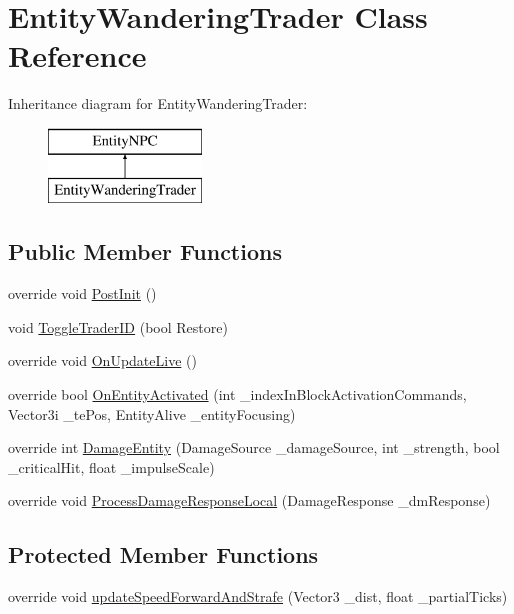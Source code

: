 \hypertarget{class_entity_wandering_trader}{}\section{Entity\+Wandering\+Trader Class Reference}
\label{class_entity_wandering_trader}
Inheritance diagram for Entity\+Wandering\+Trader\+:\begin{figure}[H]
\begin{center}
\leavevmode
\includegraphics[height=2.000000cm]{class_entity_wandering_trader}
\end{center}
\end{figure}
\subsection*{Public Member Functions}
\begin{DoxyCompactItemize}
\item 
override void \mbox{\hyperlink{class_entity_wandering_trader_abd28fa0f0a2ef37396d0c9669c659da2}{Post\+Init}} ()
\item 
void \mbox{\hyperlink{class_entity_wandering_trader_a69dd924900c7fbd29d0d8d60eb3fef84}{Toggle\+Trader\+ID}} (bool Restore)
\item 
override void \mbox{\hyperlink{class_entity_wandering_trader_a7da11dfb0d8ca77baac19b566b157134}{On\+Update\+Live}} ()
\item 
override bool \mbox{\hyperlink{class_entity_wandering_trader_a33a263cf3022eefec249466a4cc2b9bc}{On\+Entity\+Activated}} (int \+\_\+index\+In\+Block\+Activation\+Commands, Vector3i \+\_\+te\+Pos, Entity\+Alive \+\_\+entity\+Focusing)
\item 
override int \mbox{\hyperlink{class_entity_wandering_trader_a6921d5c83ea2491820dbe7f168141e40}{Damage\+Entity}} (Damage\+Source \+\_\+damage\+Source, int \+\_\+strength, bool \+\_\+critical\+Hit, float \+\_\+impulse\+Scale)
\item 
override void \mbox{\hyperlink{class_entity_wandering_trader_a25f75b07bb3da64df34855c23225015d}{Process\+Damage\+Response\+Local}} (Damage\+Response \+\_\+dm\+Response)
\end{DoxyCompactItemize}
\subsection*{Protected Member Functions}
\begin{DoxyCompactItemize}
\item 
override void \mbox{\hyperlink{class_entity_wandering_trader_a52a62140eb8466285b6305988c51066e}{update\+Speed\+Forward\+And\+Strafe}} (Vector3 \+\_\+dist, float \+\_\+partial\+Ticks)
\end{DoxyCompactItemize}



